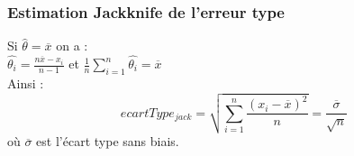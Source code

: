 \documentclass[handout]{beamer}
\begin{document}
		\begin{frame}
			\frametitle{Estimation Jackknife de l'erreur type}
			Si $\hat{\theta} = \overline{x}$ on a :\\

			\vspace{5px}
			$\hat{\theta_i} = \frac{n\overline{x} - x_i}{n - 1}$ et $\frac{1}{n} \sum\limits_{i=1}^n \hat{\theta_i} = \overline{x}$\\

			\vspace{15px}
			Ainsi :
			\[ecartType_{jack} = \sqrt{\sum\limits_{i=1}^n \frac{(x_i - \overline{x})^2}{n}} = \frac{\overline{\sigma}}{\sqrt{n}}\]
			où $\overline{\sigma}$ est l'écart type sans biais.
		\end{frame}
\end{document}
